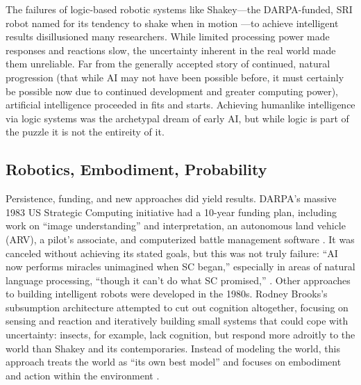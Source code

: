 The failures of logic-based robotic systems like Shakey---the
DARPA-funded, SRI
robot named for its tendency to shake when in motion \cite[Ch.
  10]{mccorduck}---to achieve intelligent results disillusioned many
researchers. While limited processing power made responses and reactions slow, the
uncertainty inherent in the real world made them unreliable. Far from
the generally accepted story of continued, natural 
progression (that while AI may not have been possible before, it must
certainly be possible now due to continued development and greater
computing power), artificial intelligence proceeded in fits and
starts. Achieving humanlike intelligence via logic 
systems was the archetypal dream of early AI, but while logic is
part of the puzzle it is not the entireity of it.

\subsection{Robotics, Embodiment, Probability}

Persistence, funding, and new approaches did yield results.
DARPA's massive 1983 US Strategic Computing initiative had a 10-year
funding plan, including work on ``image understanding'' and
interpretation, an autonomous land vehicle (ARV), a pilot's associate,
and computerized battle management software \cite{rolandShiman}. It
was canceled without 
achieving its stated goals, but this was not truly failure: ``AI now
performs miracles unimagined when SC 
began,'' especially in areas of natural language processing, ``though
it can't do what SC promised,'' \cite[p. 328]{rolandShiman}. Other
approaches to building intelligent robots were developed in the 1980s. Rodney 
Brooks's subsumption architecture \cite[p.
  353]{mobilebrooks} attempted to cut out 
cognition altogether, focusing on sensing and reaction and iteratively
building small systems that could cope with uncertainty:
insects, for example, lack cognition, but respond more adroitly to the
world than Shakey and its contemporaries. Instead of modeling the
world, this approach treats
the world as ``its own best model'' and focuses on embodiment and action
within the environment \cite[p. 256]{ekbia}.

